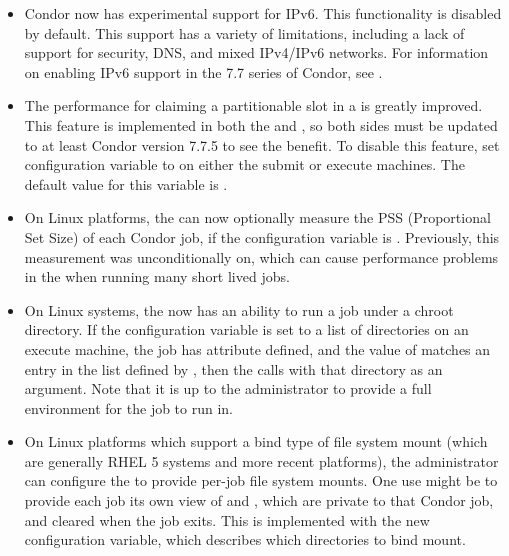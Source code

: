 \begin{itemize}

\item Condor now has experimental support for IPv6.  
This functionality is disabled by default.  
This support has a variety of limitations, 
including a lack of support for security, DNS, and mixed IPv4/IPv6 networks.  
For information on enabling IPv6 support in the 7.7 series of Condor, 
see .

\item The performance for claiming a partitionable slot in a 
 is greatly improved.  
This feature is implemented in both the  and ,
so both sides must be updated to at least Condor version 7.7.5 
to see the benefit.  
To disable this feature, set configuration variable
 to  
on either the submit or execute machines.  
The default value for this variable is .

\item On Linux platforms, the  can now optionally measure the
PSS (Proportional Set Size) of each Condor job,
if the configuration variable  is .
Previously, this measurement was unconditionally on,
which can cause performance problems in the  when running
many short lived jobs.

\item On Linux systems, the  now has an ability to run a 
job under a chroot directory.  
If the configuration variable  is set to a list
of directories on an execute machine, 
the job has attribute  defined,
and the value of  matches an entry 
in the list defined by ,
then the  calls  with that directory 
as an argument.  
Note that it is up to the administrator to provide a full environment 
for the job to run in.

\item On Linux platforms which support a bind type of file system mount 
(which are generally RHEL 5 systems and more recent platforms), 
the administrator can configure the  
to provide per-job file system mounts.  
One use might be to provide each job its own view of  
and , which are private to that Condor job,
and cleared when the job exits.  
This is implemented with the new  
configuration variable, which describes which directories to bind mount.


\end{itemize}

